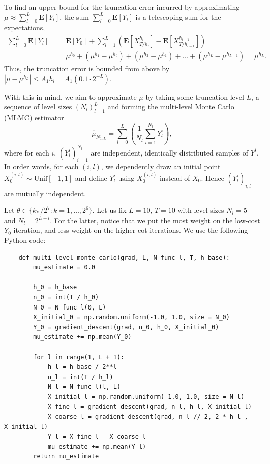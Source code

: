 \documentclass{article}
\begin{document}
To find an upper bound for the truncation error incurred by approximating \(\mu \approx \sum_{l=0}^L \mathbf{E}[Y_l]\), the sum \(\sum_{l=0}^L \mathbf{E}[Y_l]\) is a telescoping sum for the expectations,
\begin{eqnarray*}
    \sum_{l=0}^L \mathbf{E}[Y_l] & = & \mathbf{E}[Y_0] + \sum_{l=1}^L (\mathbf{E}[X^{h_l}_{T/h_l}] - \mathbf{E}[X^{h_{l-1}}_{T/h_{l-1}}]) \\
    & = & \mu^{h_0} + (\mu^{h_1} - \mu^{h_0}) + (\mu^{h_2} - \mu^{h_1}) + \dots + (\mu^{h_L} - \mu^{h_{L-1}}) = \mu^{h_L}. 
\end{eqnarray*}
Thus, the truncation error is bounded from above by \(|\mu - \mu^{h_L}| \leq A_1h_l = A_1 (0.1 \cdot 2^{-L})\).

With this in mind, we aim to approximate \(\mu\) by taking some truncation level \(L\), a sequence of level sizes \((N_l)_{l=1}^L\) and forming the multi-level Monte Carlo (MLMC) estimator 
\[ \hat\mu_{N_{1:L}} = \sum_{l=0}^L \left(\frac{1}{N_l} \sum_{i=1}^{N_l} Y_l^i\right), \]
where for each \(i\), \((Y_l^i)_{i=1}^{N_l}\) are independent, identically distributed samples of \(Y^i\). In order words, for each \((i,l)\), we dependently draw an initial point \(X_0^{(i,l)} \sim \mathrm{Unif}[-1, 1]\) and define \(Y^i_l\) using \(X_0^{(i,l)}\) instead of \(X_0\). Hence \((Y_l^i)_{i,l}\) are mutually independent.

Let \(\theta \in \{ k\pi / 2^7 : k = 1, \dots, 2^6 \}\). Let us fix \(L = 10\), \(T = 10\) with level sizes \(N_l = 5\) and \(N_l = 2^{L-l}\). For the latter, notice that we put the most weight on the low-cost \(Y_0\) iteration, and less weight on the higher-cot iterations. We use the following Python code:

\begin{verbatim}
    def multi_level_monte_carlo(grad, L, N_func_l, T, h_base):
        mu_estimate = 0.0
    
        h_0 = h_base
        n_0 = int(T / h_0)
        N_0 = N_func_l(0, L)
        X_initial_0 = np.random.uniform(-1.0, 1.0, size = N_0)
        Y_0 = gradient_descent(grad, n_0, h_0, X_initial_0)
        mu_estimate += np.mean(Y_0)
    
        for l in range(1, L + 1):
            h_l = h_base / 2**l
            n_l = int(T / h_l)
            N_l = N_func_l(l, L)
            X_initial_l = np.random.uniform(-1.0, 1.0, size = N_l)
            X_fine_l = gradient_descent(grad, n_l, h_l, X_initial_l)
            X_coarse_l = gradient_descent(grad, n_l // 2, 2 * h_l , X_initial_l)
            Y_l = X_fine_l - X_coarse_l
            mu_estimate += np.mean(Y_l)
        return mu_estimate
\end{verbatim}
\end{document}
